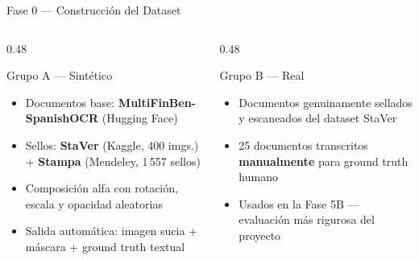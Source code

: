 \documentclass[aspectratio=169, 11pt]{beamer}
\begin{document}
\begin{frame}{Fase 0 — Construcción del Dataset}
  \begin{columns}[T]
    \begin{column}{0.48\textwidth}
      \begin{block}{Grupo A — Sintético}
        \begin{itemize}
          \item Documentos base: \textbf{MultiFinBen-SpanishOCR} (Hugging Face)
          \item Sellos: \textbf{StaVer} (Kaggle, 400 imgs.) + \textbf{Stampa} (Mendeley, 1\,557 sellos)
          \item Composición alfa con rotación, escala y opacidad aleatorias
          \item Salida automática: imagen sucia + máscara + ground truth textual
        \end{itemize}
      \end{block}
    \end{column}
    \begin{column}{0.48\textwidth}
      \begin{block}{Grupo B — Real}
        \begin{itemize}
          \item Documentos genuinamente sellados y escaneados del dataset StaVer
          \item 25 documentos transcritos \textbf{manualmente} para ground truth humano
          \item Usados en la Fase 5B — evaluación más rigurosa del proyecto
        \end{itemize}
      \end{block}
    \end{column}
  \end{columns}
\end{frame}
\end{document}
